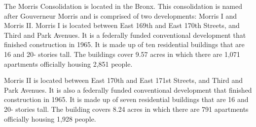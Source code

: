      

   

The Morris Consolidation is located in the Bronx. This consolidation is named after Gouverneur Morris and is comprised of two developments: Morris I and Morris II. Morris I is located between East 169th and East 170th Streets, and Third and Park Avenues. It is a federally funded conventional development that finished construction in 1965. It is made up of ten residential buildings that are 16 and 20- stories tall. The buildings cover 9.57 acres in which there are 1,071 apartments officially housing 2,851 people. 

Morris II is located between East 170th and East 171st Streets, and Third and Park Avenues. It is also a federally funded conventional development that finished construction in 1965.  It is made up of seven residential buildings that are 16 and 20- stories tall. The building covers 8.24 acres in which there are 791 apartments officially housing 1,928 people.